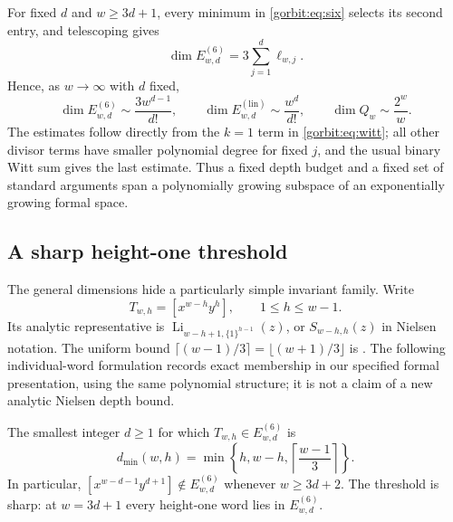 For fixed $d$ and $w\ge3d+1$, every minimum in
\eqref{gorbit:eq:six} selects its second entry, and telescoping gives
\begin{equation}\label{gorbit:eq:stable}
 \dim E^{(6)}_{w,d}=3\sum_{j=1}^{d}\ell_{w,j}.
\end{equation}
Hence, as $w\to\infty$ with $d$ fixed,
\[
 \dim E^{(6)}_{w,d}\sim\frac{3w^{d-1}}{d!},\qquad
 \dim E^{(\mathrm{lin})}_{w,d}\sim\frac{w^d}{d!},\qquad
 \dim Q_w\sim\frac{2^w}{w}.
\]
The estimates follow directly from the $k=1$ term in
\eqref{gorbit:eq:witt}; all other divisor terms have smaller polynomial
degree for fixed $j$, and the usual binary Witt sum gives the last
estimate. Thus a fixed depth budget and a fixed set of standard arguments
span a polynomially growing subspace of an exponentially growing formal
space.

\subsection{A sharp height-one threshold}

The general dimensions hide a particularly simple invariant family.
Write
\[
 T_{w,h}=[x^{w-h}y^h],\qquad 1\le h\le w-1.
\]
Its analytic representative is
$\operatorname{Li}_{w-h+1,\{1\}^{h-1}}(z)$, or $S_{w-h,h}(z)$ in
Nielsen notation. The uniform bound
$\lceil(w-1)/3\rceil=\lfloor(w+1)/3\rfloor$ is
\cite[Theorem~7]{gorbit:CGR}. The following individual-word formulation
records exact membership in our specified formal presentation, using
the same polynomial structure; it is not a claim of a new analytic
Nielsen depth bound.

\begin{theorem}
\label{gorbit:thm:height}
The smallest integer $d\ge1$ for which
$T_{w,h}\in E^{(6)}_{w,d}$ is
\begin{equation}\label{gorbit:eq:height-depth}
 \boxed{\qquad
 d_{\min}(w,h)=\min\left\{h,w-h,
                       \left\lceil\frac{w-1}{3}\right\rceil\right\}.
 \qquad}
\end{equation}
In particular,
$[x^{w-d-1}y^{d+1}]\notin E^{(6)}_{w,d}$ whenever $w\ge3d+2$.
The threshold is sharp: at $w=3d+1$ every height-one word lies in
$E^{(6)}_{w,d}$.
\end{theorem}

